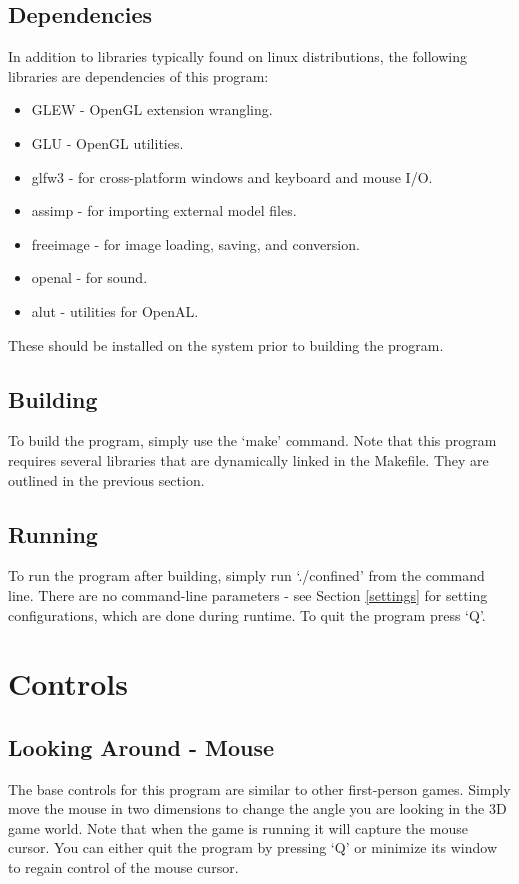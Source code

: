 \documentclass[oneside]{book}
\begin{document}
    \subsection{Dependencies}
      In addition to libraries typically found on linux distributions, the following libraries are dependencies of this program:
      \begin{itemize}
        \item GLEW - OpenGL extension wrangling.
        \item GLU - OpenGL utilities.
        \item glfw3 - for cross-platform windows and keyboard and mouse I/O.
        \item assimp - for importing external model files.
        \item freeimage - for image loading, saving, and conversion.
        \item openal - for sound.
        \item alut - utilities for OpenAL.
      \end{itemize}

      These should be installed on the system prior to building the program.

    \subsection{Building}
      To build the program, simply use the `make' command.
      Note that this program requires several libraries that are dynamically linked in the Makefile. They are outlined in the previous section.

    \subsection{Running}
      To run the program after building, simply run `./confined' from the command line.
      There are no command-line parameters - see Section \ref{settings} for setting configurations, which are done during runtime.
      To quit the program press `Q'.

  \section{Controls}
    \subsection{Looking Around - Mouse}
      The base controls for this program are similar to other first-person games.
      Simply move the mouse in two dimensions to change the angle you are looking in the 3D game world.
      Note that when the game is running it will capture the mouse cursor. You can either quit the program by pressing `Q' or minimize its window to regain control of the mouse cursor.
\end{document}
